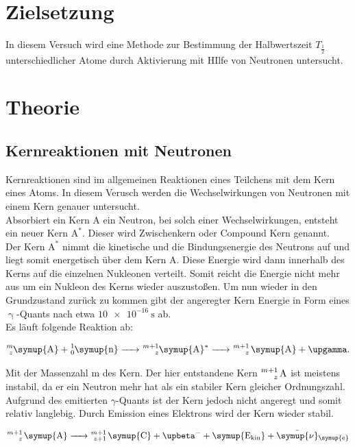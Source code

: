 \section{Zielsetzung}

\noindent In diesem Versuch wird eine Methode zur Bestimmung der Halbwertszeit $T_\frac{1}{2}$ unterschiedlicher Atome durch Aktivierung mit HIlfe von Neutronen untersucht.

\section{Theorie}

\subsection{Kernreaktionen mit Neutronen}

\noindent Kernreaktionen sind im allgemeinen Reaktionen eines Teilchens mit dem Kern eines Atoms. In diesem Verusch werden die Wechselwirkungen 
von Neutronen mit einem Kern genauer untersucht. \\
Absorbiert ein Kern A ein Neutron, bei solch einer Wechselwirkungen, entsteht ein neuer Kern
$\text{A}^{\ast}$. Dieser wird Zwischenkern oder Compound Kern genannt. \\
Der Kern $\text{A}^{\ast}$ nimmt die kinetische und die Bindungsenergie 
des Neutrons auf und liegt somit energetisch über dem Kern A. Diese Energie wird dann innerhalb des Kerns auf die einzelnen Nukleonen verteilt. 
Somit reicht die Energie nicht mehr aus um ein Nukleon des Kerns wieder auszustoßen. Um nun wieder in den Grundzustand zurück zu kommen gibt der 
angeregter Kern Energie in Form eines $\upgamma$-Quants nach etwa $\SI{10e-16}{\second}$ ab.\\
Es läuft folgende Reaktion ab:

\begin{equation*}
   \ce{^m_z\symup{A} + ^1_0\symup{n} -> ^{m+1}_z\symup{A}^{\ast} -> ^{m+1}_z \symup{A} + \upgamma }. \nonumber
\end{equation*}

\noindent Mit der Massenzahl m des Kern. Der hier entstandene Kern $\ce{^{m+1}_z \text{A}}$ ist meistens instabil, da er ein Neutron mehr hat als ein 
stabiler Kern gleicher Ordnungszahl. Aufgrund des emitierten $\gamma$-Quants ist der Kern jedoch nicht angeregt und somit relativ langlebig.
Durch Emission eines Elektrons wird der Kern wieder stabil.

\begin{equation*}
   \ce{^{m+1}_z \symup{A} -> ^{m+1}_{z+1} \symup{C} + \upbeta^- + \symup{E_{kin}} + \bar{\symup{\nu}}_{\symup{e}}} \nonumber
\end{equation*}

